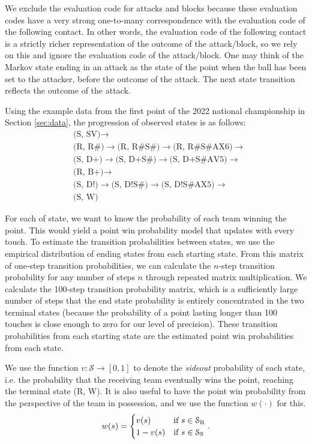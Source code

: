 \documentclass[USenglish]{article}
\theoremstyle{dgthm}
\theoremstyle{dgdef}
\begin{document}
We exclude the evaluation code for attacks and blocks because these evaluation codes have a very strong one-to-many correspondence with the evaluation code of the following contact. In other words, the evaluation code of the following contact is a strictly richer representation of the outcome of the attack/block, so we rely on this and ignore the evaluation code of the attack/block. One may think of the Markov state ending in an attack as the state of the point when the ball has been set to the attacker, before the outcome of the attack. The next state transition reflects the outcome of the attack.

Using the example data from the first point of the 2022 national championship in Section \ref{sec:data}, the progression of observed states is as follows:
\begin{align*}
    &\mbox{(S, SV)}  \rightarrow\\
    &\mbox{(R, R\#)} \rightarrow \mbox{(R, R\#S\#)} \rightarrow \mbox{(R, R\#S\#AX6)} \rightarrow\\
    &\mbox{(S, D+)}  \rightarrow \mbox{(S, D+S\#)}  \rightarrow \mbox{(S, D+S\#AV5)}  \rightarrow\\
    &\mbox{(R, B+)}  \rightarrow\\
    &\mbox{(S, D!)}  \rightarrow \mbox{(S, D!S\#)}  \rightarrow \mbox{(S, D!S\#AX5)}  \rightarrow\\
    &\mbox{(S, W)}
\end{align*}

For each of state, we want to know the probability of each team winning the point. This would yield a point win probability model that updates with every touch. To estimate the transition probabilities between states, we use the empirical distribution of ending states from each starting state. From this matrix of one-step transition probabilities, we can calculate the $n$-step transition probability for any number of steps $n$ through repeated matrix multiplication. We calculate the 100-step transition probability matrix, which is a sufficiently large number of steps that the end state probability is entirely concentrated in the two terminal states (because the probability of a point lasting longer than 100 touches is close enough to zero for our level of precision). These transition probabilities from each starting state are the estimated point win probabilities from each state.

We use the function $v: \mathcal{S} \rightarrow [0, 1]$ to denote the {\it sideout} probability of each state, i.e. the probability that the receiving team eventually wins the point, reaching the terminal state (R, W). It is also useful to have the point win probability from the perspective of the team in possession, and we use the function $w(\cdot)$ for this.
\begin{equation*}
    w(s) = \begin{cases}
        v(s)        & \mbox{if } s \in \mathcal{S}_{\mbox{\scriptsize R}}\\
        1 - v(s)    & \mbox{if } s \in \mathcal{S}_{\mbox{\scriptsize S}}
    \end{cases}.
\end{equation*}
\end{document}
